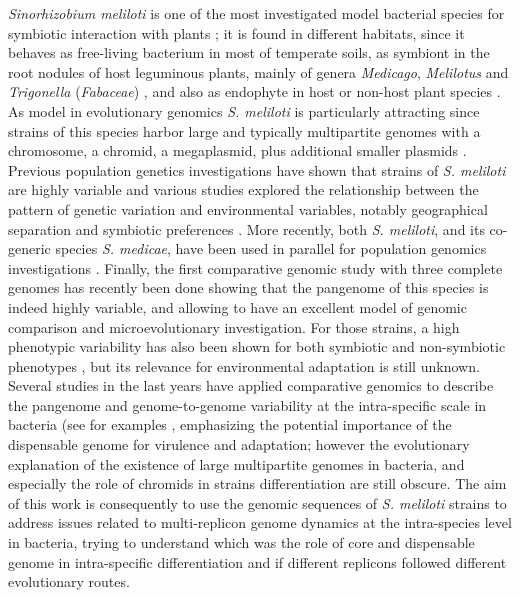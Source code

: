 \textit{Sinorhizobium meliloti} is one of the most investigated model bacterial species for symbiotic interaction with plants \cite{gibson2008molecular}; it is found in different habitats, since it behaves as free-living bacterium in most of temperate soils, as symbiont in the root nodules of host leguminous plants, mainly of genera \textit{Medicago}, \textit{Melilotus} and \textit{Trigonella} (\textit{Fabaceae}) \cite{sprent2001nodulation}, and also as endophyte in host \cite{pini2012exploring} or non-host plant species \cite{chi2005ascending}. As model in evolutionary genomics \textit{S. meliloti} is particularly attracting since strains of this species harbor large and typically multipartite genomes with a chromosome, a chromid, a megaplasmid, plus additional smaller plasmids \cite{krawiec1990organization}\cite{galibert2001composite}\cite{galardini2011exploring}\cite{tian2012comparative}. Previous population genetics investigations have shown that strains of \textit{S. meliloti} are highly variable and various studies explored the relationship between the pattern of genetic variation and environmental variables, notably geographical separation and symbiotic preferences \cite{paffetti1996genetic} \cite{paffetti1998influence} \cite{carelli2000genetic} \cite{jebara2001genetic} \cite{bailly2011population} \cite{talebi2008diversity} \cite{trabelsi2010genetic}. More recently, both \textit{S. meliloti}, and its co-generic species \textit{S. medicae}, have been used in parallel for population genomics investigations \cite{donini2009genome} \cite{bailly2011population}\cite{epstein2012population}. Finally, the first comparative genomic study with three complete genomes has recently been done \cite{galardini2011exploring} showing that the pangenome of this species is indeed highly variable, and allowing to have an excellent model of genomic comparison and microevolutionary investigation. For those strains, a high phenotypic variability has also been shown for both symbiotic and non-symbiotic phenotypes \cite{biondi2009metabolic}, but its relevance for environmental adaptation is still unknown.
Several studies in the last years have applied comparative genomics to describe the pangenome and genome-to-genome variability at the intra-specific scale in bacteria (see for examples \cite{brosch2001evolution} \cite{edwards2002comparative} \cite{deng2003comparative} \cite{mols2007metabolic} \cite{rasko2008pangenome} \cite{cho2010genomic} \cite{deng2010probing} \cite{antonio2010comparative} \cite{lukjancenko2010comparison} \cite{galardini2011exploring} \cite{epstein2012population} \cite{tian2012comparative}, emphasizing the potential importance of the dispensable genome for virulence and adaptation; however the evolutionary explanation of the existence of large multipartite genomes in bacteria, and especially the role of chromids in strains differentiation are still obscure. The aim of this work is consequently to use the genomic sequences of \textit{S. meliloti} strains to address issues related to multi-replicon genome dynamics at the intra-species level in bacteria,  trying to understand which was the role of core and dispensable genome in intra-specific differentiation and if different replicons followed different evolutionary routes.

